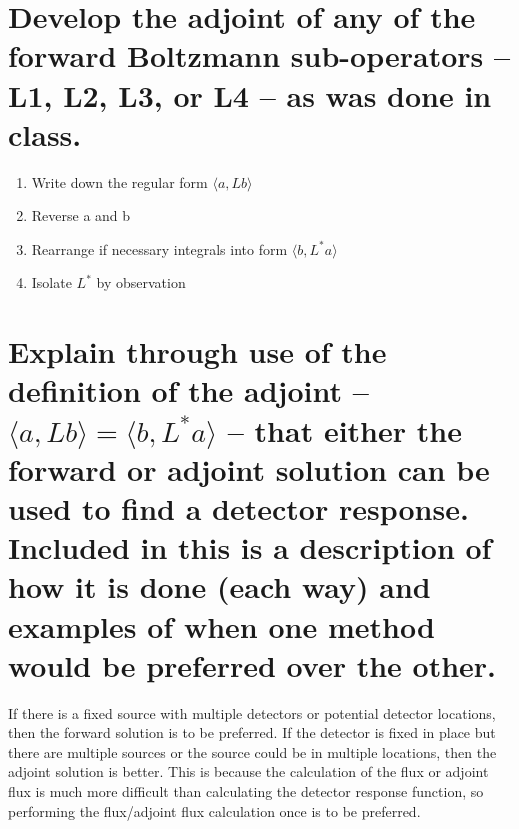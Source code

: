 \documentclass{article}
\begin{document}
\newpage
\section{Develop the adjoint of any of the forward Boltzmann sub-operators -- L1, L2, L3, or L4 -- as was done in class.}

\begin{enumerate}
	\item Write down the regular form $\langle a, Lb \rangle$
	\item Reverse a and b
	\item Rearrange if necessary integrals into form $\langle b, L^* a \rangle$
	\item Isolate $L^*$ by observation
\end{enumerate}

\newpage
\section{Explain through use of the definition of the adjoint -- $\langle a, Lb \rangle = \langle b,L^*a \rangle$ -- that either the forward or adjoint solution can be used to find a detector response.  Included in this is a description of how it is done (each way) and examples of when one method would be preferred over the other.}

If there is a fixed source with multiple detectors or potential detector locations, then the forward solution is to be preferred. If the detector is fixed in place but there are multiple sources or the source could be in multiple locations, then the adjoint solution is better. This is because the calculation of the flux or adjoint flux is much more difficult than calculating the detector response function, so performing the flux/adjoint flux calculation once is to be preferred.
\end{document}
